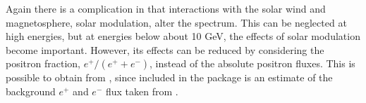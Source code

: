 Again there is a complication in that interactions with the solar wind and
magnetosphere, solar modulation, alter the spectrum.  This can be neglected at
high energies, but at energies below about 10 GeV, the effects of solar
modulation become important. However, its effects can be reduced by considering
the positron fraction, $e^+/(e^+ + e^-)$, instead of the absolute positron
fluxes. This is possible to obtain from \ds, since included in the package is
an estimate of the background $e^+$ and $e^-$ flux taken from
\cite{MoskStrong98}.



